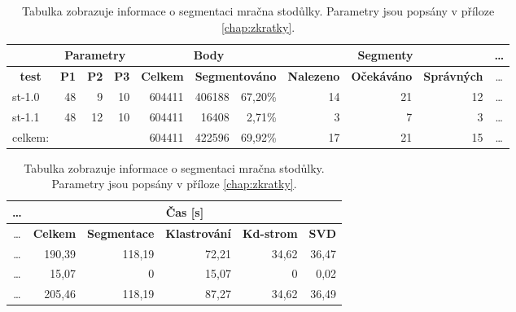 \documentclass[11pt,twoside,a4paper]{book}
\begin{document}
\begin{table}[ht]
\resizebox{\textwidth}{!} {
\begin{tabular}{|l|c|l|l|r|r|r|r|r|r|c|}
\hline
\textbf{} & \multicolumn{ 3}{c|}{\textbf{Parametry}} & \multicolumn{ 3}{c|}{\textbf{Body}} & \multicolumn{ 3}{c|}{\textbf{Segmenty}} &\ldots\\ \hline
\multicolumn{1}{|c|}{\textbf{test}} & \textbf{P1} & \multicolumn{1}{c|}{\textbf{P2}} & \multicolumn{1}{c|}{\textbf{P3}} & \multicolumn{1}{c|}{\textbf{Celkem}} & \multicolumn{ 2}{c|}{\textbf{Segmentováno}} & \multicolumn{1}{c|}{\textbf{Nalezeno}} & \multicolumn{1}{c|}{\textbf{Očekáváno }} & \multicolumn{1}{c|}{\textbf{Správných}} &\ldots\\ \hline
st-1.0 & \multicolumn{1}{r|}{48} & \multicolumn{1}{r|}{9} & \multicolumn{1}{r|}{10} & 604411 & 406188 & 67,20\% & 14 & 21 & 12 &\ldots\\ \hline
st-1.1 & \multicolumn{1}{r|}{48} & \multicolumn{1}{r|}{12} & \multicolumn{1}{r|}{10} & 604411 & 16408 & 2,71\% & 3 & 7 & 3 &\ldots\\ \hline
celkem: & \multicolumn{1}{l|}{} &  &  & 604411 & 422596 & 69,92\% & 17 & 21 & 15&\ldots \\ \hline
\end{tabular}
}
\begin{flushright} \scalebox{0.9} {
\begin{tabular}{|c|r|r|r|r|r|}
\hline
\ldots& \multicolumn{ 5}{|c|}{\textbf{Čas [s]}} \\ \hline
\ldots& \multicolumn{1}{|c|}{\textbf{Celkem}} & \multicolumn{1}{c|}{\textbf{Segmentace}} & \multicolumn{1}{c|}{\textbf{Klastrování}} & \multicolumn{1}{c|}{\textbf{Kd-strom}} & \multicolumn{1}{c|}{\textbf{SVD}} \\ \hline
\ldots& 190,39 & 118,19 & 72,21 & 34,62 & 36,47 \\ \hline
\ldots& 15,07 & 0 & 15,07 & 0 & 0,02 \\ \hline
\ldots& 205,46 & 118,19 & 87,27 & 34,62 & 36,49 \\ \hline
\end{tabular}
}\end{flushright}

\caption{Tabulka zobrazuje informace o segmentaci mračna stodůlky. Parametry jsou popsány v příloze \ref{chap:zkratky}.} 
\label{table:test-st}
\end{table}
\end{document}
